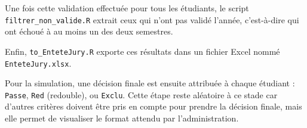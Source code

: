\vspace{0.5em}
Une fois cette validation effectuée pour tous les étudiants, le script \texttt{filtrer\_non\_valide.R} extrait ceux qui n'ont pas validé l’année, c’est-à-dire qui ont échoué à au moins un des deux semestres.

\vspace{0.5em}
Enfin, \texttt{to\_EnteteJury.R} exporte ces résultats dans un fichier Excel nommé \texttt{EnteteJury.xlsx}.

\vspace{0.5em}
Pour la simulation, une décision finale est ensuite attribuée à chaque étudiant : \texttt{Passe}, \texttt{Red} (redouble), ou \texttt{Exclu}. Cette étape reste aléatoire à ce stade car d'autres critères doivent être pris en compte pour prendre la décision finale, mais elle permet de visualiser le format attendu par l’administration.
